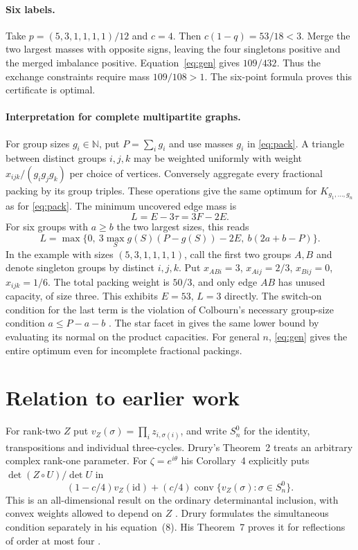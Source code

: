 \documentclass[11pt]{article}
\DeclareMathOperator{\conv}{conv}
\begin{document}
\paragraph{Six labels.}
Take $p=(5,3,1,1,1,1)/12$ and $c=4$. Then $c(1-q)=53/18<3$. Merge the two largest masses with opposite signs, leaving the four singletons positive and the merged imbalance positive. Equation~\eqref{eq:gen} gives $109/432$. Thus the exchange constraints require mass $109/108>1$. The six-point formula proves this certificate is optimal.

\paragraph{Interpretation for complete multipartite graphs.}
For group sizes $g_i\in\mathbb N$, put $P=\sum_i g_i$ and use masses $g_i$ in \eqref{eq:pack}. A triangle between distinct groups $i,j,k$ may be weighted uniformly with weight $x_{ijk}/(g_i g_j g_k)$ per choice of vertices. Conversely aggregate every fractional packing by its group triples. These operations give the same optimum for $K_{g_1,\ldots,g_n}$ as for \eqref{eq:pack}. The minimum uncovered edge mass is
\[
 L=E-3\tau=3F-2E .
\]
For six groups with $a\ge b$ the two largest sizes, this reads
\[
 L=\max\{0,\ 3\max_S g(S)(P-g(S))-2E,\ b(2a+b-P)\}.
\]
In the example with sizes $(5,3,1,1,1,1)$, call the first two groups $A,B$ and denote singleton groups by distinct $i,j,k$. Put $x_{ABi}=3$, $x_{Aij}=2/3$, $x_{Bij}=0$, $x_{ijk}=1/6$. The total packing weight is $50/3$, and only edge $AB$ has unused capacity, of size three. This exhibits $E=53$, $L=3$ directly. The switch-on condition for the last term is the violation of Colbourn's necessary group-size condition $a\le P-a-b$ \cite[Lemma 2.1(3)]{Colbourn}. The star facet in \cite[Example 2.6]{Dukes} gives the same lower bound by evaluating its normal on the product capacities. For general $n$, \eqref{eq:gen} gives the entire optimum even for incomplete fractional packings.

\section{Relation to earlier work}
For rank-two $Z$ put $v_Z(\sigma)=\prod_i z_{i,\sigma(i)}$, and write $S_n^0$ for the identity, transpositions and individual three-cycles. Drury's Theorem~2 treats an arbitrary complex rank-one parameter. For $\zeta=e^{i\theta}$ his Corollary~4 explicitly puts $\det(Z\circ U)/\det U$ in
\[
  (1-c/4)v_Z(\mathrm{id})+(c/4)\conv\{v_Z(\sigma):\sigma\in S_n^0\}.
\]
This is an all-dimensional result on the ordinary determinantal inclusion, with convex weights allowed to depend on $Z$ \cite[pp.~160--161, equations (2)--(3)]{Drury}. Drury formulates the simultaneous condition separately in his equation~(8). His Theorem~7 proves it for reflections of order at most four \cite[pp.~162--164]{Drury}.
\end{document}
